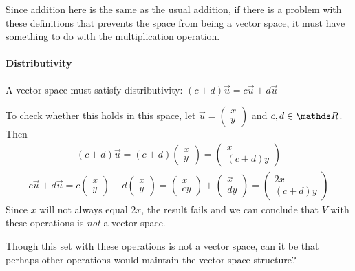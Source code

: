 \documentclass[11pt]{article}
\newcommand{\vek}[1]{\vec{#1}}
\begin{document}
\vspace{1cm}
Since addition here is the same as the usual addition, if there is a problem with these definitions that prevents the space from being a vector space, it must have something to do with the multiplication operation.

\paragraph{Distributivity} A vector space must satisfy distributivity: $(c + d) \vek{u} = c \vek{u} + d \vek{u}$

To check whether this holds in this space, let $\vek{u} = \begin{pmatrix}x \\ y\end{pmatrix}$ and $c,d \in \bbR$. Then
\begin{align*}
(c + d) \vek{u} = (c+d) \begin{pmatrix}x \\ y\end{pmatrix} = \begin{pmatrix}x \\ (c+d)y \end{pmatrix}
\end{align*}
\begin{align*}
c \vek{u} + d \vek{u} = c \begin{pmatrix}x \\ y\end{pmatrix} + d \begin{pmatrix}x \\ y\end{pmatrix}
= \begin{pmatrix}x \\ cy\end{pmatrix} + \begin{pmatrix}x \\ dy\end{pmatrix}
= \begin{pmatrix}2x \\ (c+d)y\end{pmatrix}
\end{align*}
Since $x$ will not always equal $2x$, the result fails and we can conclude that $V$ with these operations is \emph{not} a vector space.

Though this set with these operations is not a vector space, can it be that perhaps other operations would maintain the vector space structure?
\end{document}
